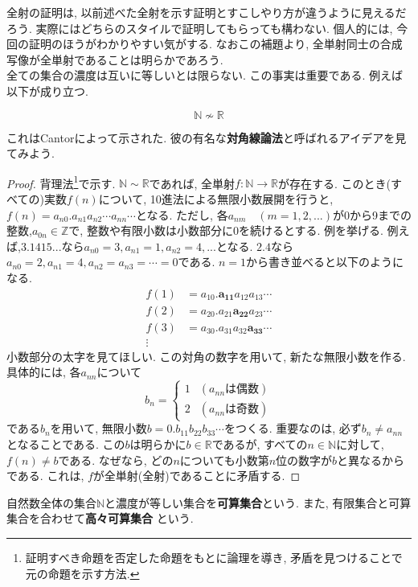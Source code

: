             全射の証明は, 以前述べた全射を示す証明とすこしやり方が違うように見えるだろう. 実際にはどちらのスタイルで証明してもらっても構わない. 個人的には, 今回の証明のほうがわかりやすい気がする.
            なおこの補題より, 全単射同士の合成写像が全単射であることは明らかであろう.\\

            全ての集合の濃度は互いに等しいとは限らない. この事実は重要である. 例えば以下が成り立つ.
            \begin{screen}
                \[\mathbb{N}\nsim \mathbb{R}\]
            \end{screen}
            これはCantorによって示された. 彼の有名な\textbf{対角線論法}と呼ばれるアイデアを見てみよう.
            \begin{proof}
                背理法\footnote{証明すべき命題を否定した命題をもとに論理を導き, 矛盾を見つけることで元の命題を示す方法.}で示す. $\mathbb{N}\sim\mathbb{R}$であれば, 全単射$f:\mathbb{N}\rightarrow \mathbb{R}$が存在する.
                このとき(すべての)実数$f(n)$について, 10進法による無限小数展開を行うと, $f(n)=a_{n0}.a_{n1}a_{n2}\cdots a_{nn}\cdots$となる. ただし, 各$a_{nm}\quad(m=1,2,...)$が0から9までの整数,$a_{0n}\in \mathbb{Z}$で, 整数や有限小数は小数部分に0を続けるとする.
                例を挙げる. 例えば,$3.1415...$なら$a_{n0}=3,a_{n1}=1,a_{n2}=4,...$となる. $2.4$なら$a_{n0}=2,a_{n1}=4,a_{n2}=a_{n3}=\cdots=0$である. $n=1$から書き並べると以下のようになる.
                \begin{align*}
                    f(1)&=a_{10}.\bm{a_{11}}a_{12}a_{13}\cdots\\
                    f(2)&=a_{20}.a_{21}\bm{a_{22}}a_{23}\cdots\\
                    f(3)&=a_{30}.a_{31}a_{32}\bm{a_{33}}\cdots\\
                    \vdots
                \end{align*}
                小数部分の太字を見てほしい. この対角の数字を用いて, 新たな無限小数を作る. 具体的には, 各$a_{nn}$について
                \begin{equation*}
                    b_n=\left\{\begin{array}{lc}
                        1 & (a_{nn}は偶数)\\
                        2 & (a_{nn}は奇数)
                    \end{array}\right.
                \end{equation*}
                である$b_n$を用いて, 無限小数$b=0.b_{11}b_{22}b_{33}\cdots$をつくる. 重要なのは, 必ず$b_{n}\neq a_{nn}$となることである. この$b$は明らかに$b\in{\mathbb{R}}$であるが, 
                すべての$n\in \mathbb{N}$に対して, $f(n)\neq b$である. なぜなら, どの$n$についても小数第$n$位の数字が$b$と異なるからである.
                これは, $f$が全単射(全射)であることに矛盾する.
            \end{proof}
            自然数全体の集合$\mathbb{N}$と濃度が等しい集合を\textbf{可算集合}という. また, 有限集合と可算集合を合わせて\textbf{高々可算集合}
            という.\\

